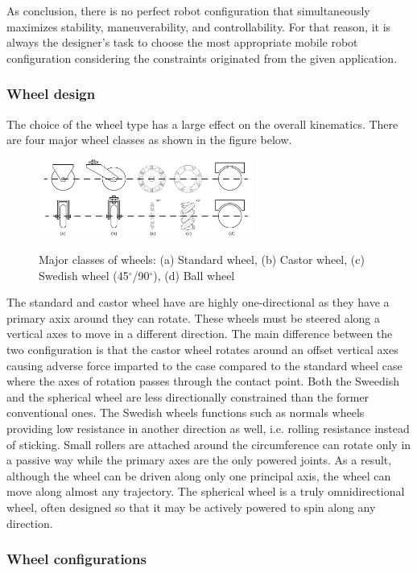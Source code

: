 \documentclass[12pt,english]{article}
\begin{document}
As conclusion, there is no perfect robot configuration that simultaneously maximizes stability, maneuverability, and controllability. For that reason, it is always the designer's task to choose the most appropriate mobile robot configuration considering the constraints originated from the given application.


\subsubsection{Wheel design}
The choice of the wheel type has a large effect on the overall kinematics. There are four major wheel classes as shown in the figure below.
\begin{figure}[h]
	\centering
	\includegraphics[width=7cm]{figures/wheels4.png}
	\label{wheels}
	\caption{Major classes of wheels: 
		(a) Standard wheel, (b) Castor wheel, (c) Swedish wheel (45$^{\circ}$/90$^{\circ}$), (d) Ball wheel}
\end{figure}
The standard and castor wheel have are highly one-directional as they have a primary axix around they can rotate. These wheels must be steered along a vertical axes to move in a different direction. The main difference between the two configuration is that the castor wheel rotates around an offset vertical axes causing adverse force imparted to the case compared to the standard wheel case where the axes of rotation passes through the contact point. Both the Sweedish and the spherical wheel are less directionally constrained than the former conventional ones. The Swedish wheels functions such as normals wheels providing low resistance in another direction as well, i.e. rolling resistance instead of sticking. Small rollers are attached around the circumference can rotate only in a passive way while the primary axes are the only powered joints. As a result, although the wheel can be driven along only one principal axis, the wheel can move along almost any trajectory. The spherical wheel is a truly omnidirectional wheel, often designed so that it may be actively powered to spin along any direction.

\subsubsection{Wheel configurations}
\end{document}
